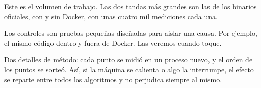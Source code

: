 Este es el volumen de trabajo. Las dos tandas más grandes son las de los binarios oficiales, con y sin Docker, con unas cuatro mil mediciones cada una.

Los controles son pruebas pequeñas diseñadas para aislar una causa. Por ejemplo, el mismo código dentro y fuera de Docker. Las veremos cuando toque.

Dos detalles de método: cada punto se midió en un proceso nuevo, y el orden de los puntos se sorteó. Así, si la máquina se calienta o algo la interrumpe, el efecto se reparte entre todos los algoritmos y no perjudica siempre al mismo.
